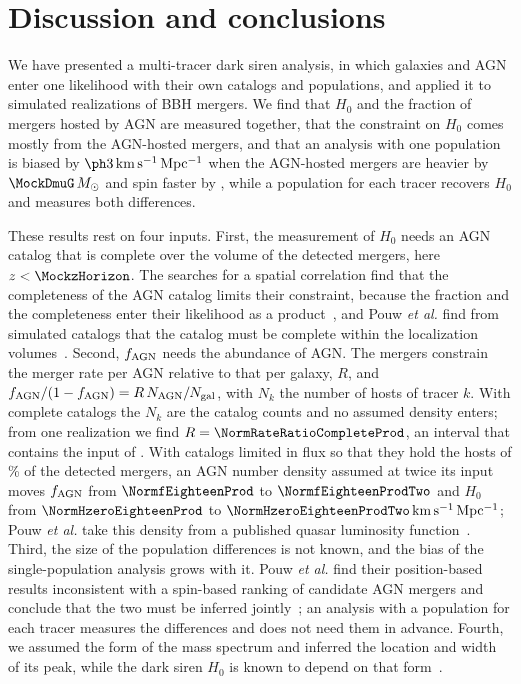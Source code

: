 \documentclass[aps,prd,reprint,amsmath,amssymb,nofootinbib]{revtex4-2}
\newcommand{\kmsMpc}{\,{\rm km\,s^{-1}\,Mpc^{-1}}}
\newcommand{\Msun}{\,M_\odot}
\newcommand{\fAGN}{f_{\rm AGN}}
\begin{document}
\section{Discussion and conclusions}
\label{sec:conclusions}

We have presented a multi-tracer dark siren analysis, in which galaxies and AGN enter one likelihood with their own catalogs and populations, and applied it to simulated realizations of \MockNev{} BBH mergers.
We find that $H_0$ and the fraction of mergers hosted by AGN are measured together, that the constraint on $H_0$ comes mostly from the AGN-hosted mergers, and that an analysis with one population is biased by $\IndBias\kmsMpc$ when the AGN-hosted mergers are heavier by $\MockDmuG\Msun$ and spin faster by \MockDmuChi, while a population for each tracer recovers $H_0$ and measures both differences. %

These results rest on four inputs.
First, the measurement of $H_0$ needs an AGN catalog that is complete over the volume of the detected mergers, here $z<\MockzHorizon$.
The searches for a spatial correlation find that the completeness of the AGN catalog limits their constraint, because the fraction and the completeness enter their likelihood as a product~\cite{Veronesi:2023ugk,Veronesi:2024tef,Zhu:2025rdv}, and Pouw \textit{et al.} find from simulated catalogs that the catalog must be complete within the localization volumes~\cite{Pouw:2026lar}.
Second, $\fAGN$ needs the abundance of AGN.
The mergers constrain the merger rate per AGN relative to that per galaxy, $R$, and $\fAGN/(1-\fAGN)=R\,N_{\rm AGN}/N_{\rm gal}$, with $N_k$ the number of hosts of tracer $k$.
With complete catalogs the $N_k$ are the catalog counts and no assumed density enters; from one realization we find $R=\NormRateRatioCompleteProd$, an interval that contains the input of \MockRateRatio.
With catalogs limited in flux so that they hold the hosts of \MockEventCompEighteen\% of the detected mergers, an AGN number density assumed at twice its input moves $\fAGN$ from $\NormfEighteenProd$ to $\NormfEighteenProdTwo$ and $H_0$ from $\NormHzeroEighteenProd$ to $\NormHzeroEighteenProdTwo\kmsMpc$; Pouw \textit{et al.} take this density from a published quasar luminosity function~\cite{Pouw:2026lar}.
Third, the size of the population differences is not known, and the bias of the single-population analysis grows with it. %
Pouw \textit{et al.} find their position-based results inconsistent with a spin-based ranking of candidate AGN mergers and conclude that the two must be inferred jointly~\cite{Pouw:2026lar}; an analysis with a population for each tracer measures the differences and does not need them in advance.
Fourth, we assumed the form of the mass spectrum and inferred the location and width of its peak, while the dark siren $H_0$ is known to depend on that form~\cite{Mastrogiovanni:2021wsd,Pierra:2023deu}.
\end{document}
